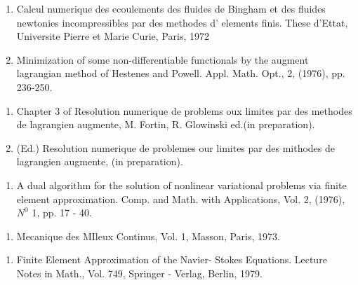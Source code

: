 \begin{thebibliography}{99}

  \begin{enumerate}
  \item Calcul numerique des ecoulements des fluides de Bingham et des
 fluides newtonies incompressibles par des methodes d' elements
 finis. These d'Ettat, Universite Pierre et Marie Curie, Paris,
 1972\label{k46:e1} 

  \item Minimization of some non-differentiable functionals by the
 augment lagrangian method of Hestenes and
 Powell. Appl. Math. Opt., 2, (1976), pp. 236-250.\label{k46:e2} 
  \end{enumerate}


  \begin{enumerate}
  \item Chapter 3 of Resolution numerique de problems oux limites par
 des methodes de lagrangien augmente, M. Fortin, R. Glowinski
 ed.(in preparation).\label{k47:e1}

  \item  (Ed.) Resolution numerique de problemes our limites par des
 mithodes de lagrangien augmente, (in preparation).\label{k47:e2} 
  \end{enumerate}

\pageoriginale

  \begin{enumerate}
  \item A dual algorithm for the solution of nonlinear variational
 problems via finite element approximation. Comp. and Math. with
 Applications, Vol. 2, (1976), $N^0$ 1, pp. 17 - 40.\label{k48:e1}
  \end{enumerate}


  \begin{enumerate}
  \item Mecanique des MIleux Continus, Vol. 1, Masson, Paris,
 1973.\label{k49:e1}
  \end{enumerate}


  \begin{enumerate}
  \item Finite Element Approximation of the Navier- Stokes
 Equations. Lecture Notes in Math., Vol. 749, Springer - Verlag,
 Berlin, 1979.\label{k50:e1} 
  \end{enumerate}


\end{thebibliography}
